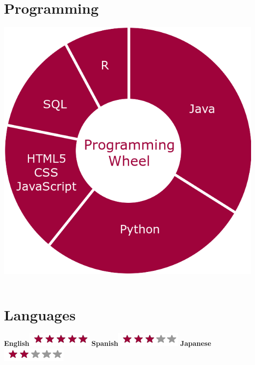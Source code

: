 \documentclass[]{friggeri-cv}
\begin{document}
\begin{aside}
  \section{Programming}
    \includegraphics[scale=0.15]{img/programmingwheel.png}
    ~
  \section{Languages}
    \textbf{English}\includegraphics[scale=0.40]{img/5stars.png}
    \textbf{Spanish}\includegraphics[scale=0.40]{img/3stars.png}
    \textbf{Japanese}\includegraphics[scale=0.40]{img/2stars.png}
    ~
\end{aside}
\end{document}

